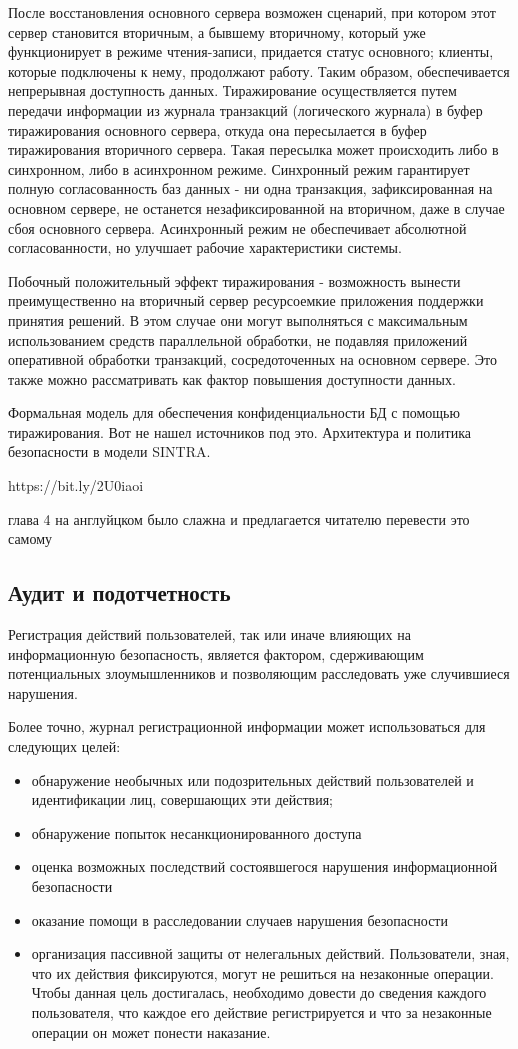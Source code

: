После восстановления основного сервера возможен сценарий, при котором этот сервер становится вторичным, а бывшему вторичному, который уже функционирует в режиме чтения-записи, придается статус основного; клиенты, которые подключены к нему, продолжают работу. Таким образом, обеспечивается непрерывная доступность данных.
Тиражирование осуществляется путем передачи информации из журнала транзакций (логического журнала) в буфер тиражирования основного сервера, откуда она пересылается в буфер тиражирования вторичного сервера. Такая пересылка может происходить либо в синхронном, либо в асинхронном режиме. Синхронный режим гарантирует полную согласованность баз данных - ни одна транзакция, зафиксированная на основном сервере, не останется незафиксированной на вторичном, даже в случае сбоя основного сервера. Асинхронный режим не обеспечивает абсолютной согласованности, но улучшает рабочие характеристики системы.

Побочный положительный эффект тиражирования - возможность вынести преимущественно на вторичный сервер ресурсоемкие приложения поддержки принятия решений. В этом случае они могут выполняться с максимальным использованием средств параллельной обработки, не подавляя приложений оперативной обработки транзакций, сосредоточенных на основном сервере. Это также можно рассматривать как фактор повышения доступности данных.

Формальная модель для обеспечения конфиденциальности БД с помощью тиражирования.
Вот не нашел источников под это.
Архитектура и политика безопасности в модели SINTRA.

https://bit.ly/2U0iaoi

глава 4 на англуйцком было слажна и предлагается читателю перевести это самому
\subsection{Аудит и подотчетность}
Регистрация действий пользователей, так или иначе влияющих на информационную безопасность, является фактором, сдерживающим потенциальных злоумышленников и позволяющим расследовать уже случившиеся нарушения.

Более точно, журнал регистрационной информации может использоваться для следующих целей:
\begin{itemize}
    \item обнаружение необычных или подозрительных действий пользователей и идентификации лиц, совершающих эти действия;
    \item обнаружение попыток несанкционированного доступа
    \item оценка возможных последствий состоявшегося нарушения информационной безопасности
    \item оказание помощи в расследовании случаев нарушения безопасности
    \item организация пассивной защиты от нелегальных действий. Пользователи, зная, что их действия фиксируются, могут не решиться на незаконные операции. Чтобы данная цель достигалась, необходимо довести до сведения каждого пользователя, что каждое его действие регистрируется и что за незаконные операции он может понести наказание.
\end{itemize}



